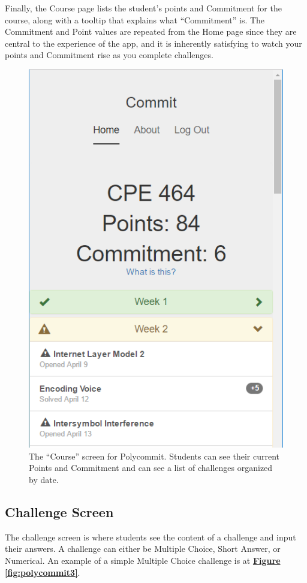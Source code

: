 \par Finally, the Course page lists the student's points and Commitment for the course, along with a tooltip that explains what ``Commitment'' is. The Commitment and Point values are repeated from the Home page since they are central to the experience of the app, and it is inherently satisfying to watch your points and Commitment rise as you complete challenges.

\begin{figure}
	\includegraphics{figures/polycommit-challenges}
	\caption{The ``Course'' screen for Polycommit. Students can see their current Points and Commitment and can see a list of challenges organized by date.}
	\label{fig:polycommit2}
\end{figure}

\subsection{Challenge Screen}
\par The challenge screen is where students see the content of a challenge and input their answers. A challenge can either be Multiple Choice, Short Answer, or Numerical. An example of a simple Multiple Choice challenge is at \textbf{\hyperref[fig:polycommit3]{Figure \ref*{fig:polycommit3}}}.

